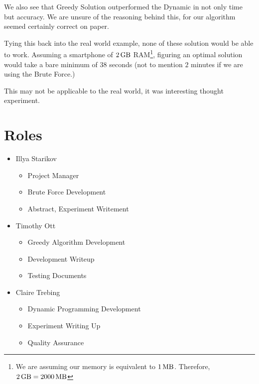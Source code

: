 \documentclass{article}
\begin{document}
We also see that Greedy Solution outperformed the Dynamic in not only time but accuracy. We are unsure of the reasoning behind this, for our algorithm seemed certainly correct on paper.

Tying this back into the real world example, none of these solution would be able to work. Assuming a smartphone of $\SI{2}{\giga\byte}$ RAM\footnote{We are assuming our memory is equivalent to $\SI{1}{\mega\byte}$. Therefore, $\SI{2}{\giga\byte} = \SI{2000}{\mega\byte}$}, figuring an optimal solution would take a bare minimum of $38$ seconds (not to mention $2$ minutes if we are using the Brute Force.)

This may not be applicable to the real world, it was interesting thought experiment.

\section{Roles}
\begin{itemize}
    \item Illya Starikov
    \begin{itemize}
        \item Project Manager
        \item Brute Force Development
        \item Abstract, Experiment Writement
    \end{itemize}
    \item Timothy Ott
    \begin{itemize}
        \item Greedy Algorithm Development
        \item Development Writeup
        \item Testing Documents
    \end{itemize}

    \item Claire Trebing
    \begin{itemize}
        \item Dynamic Programming Development
        \item Experiment Writing Up
        \item Quality Assurance
    \end{itemize}
\end{itemize}
\end{document}
